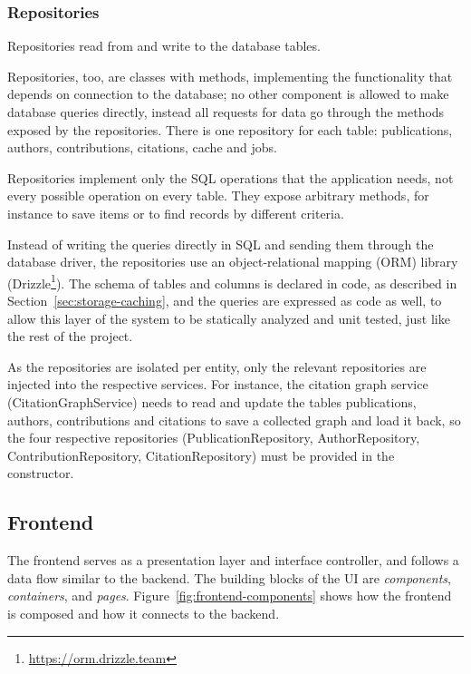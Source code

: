 \subsubsection{Repositories}

Repositories read from and write to the database tables.

Repositories, too, are classes with methods, implementing the functionality that depends on connection to the database; no other component is allowed to make database queries directly, instead all requests for data go through the methods exposed by the repositories.
There is one repository for each table: \textsf{publications}, \textsf{authors}, \textsf{contributions}, \textsf{citations}, \textsf{cache} and \textsf{jobs}.

Repositories implement only the SQL operations that the application needs, not every possible operation on every table.
They expose arbitrary methods, for instance to save items or to find records by different criteria.

Instead of writing the queries directly in SQL and sending them through the database driver, the repositories use an object-relational mapping (ORM) library (\textsf{Drizzle}\footnote{\url{https://orm.drizzle.team}}).
The schema of tables and columns is declared in code, as described in Section~\ref{sec:storage-caching}, and the queries are expressed as code as well, to allow this layer of the system to be statically analyzed and unit tested, just like the rest of the project.

As the repositories are isolated per entity, only the relevant repositories are injected into the respective services.
For instance, the citation graph service (\textsf{CitationGraphService}) needs to read and update the tables \textsf{publications}, \textsf{authors}, \textsf{contributions} and \textsf{citations} to save a collected graph and load it back, so the four respective repositories (\textsf{PublicationRepository}, \textsf{AuthorRepository}, \textsf{ContributionRepository}, \textsf{CitationRepository}) must be provided in the constructor.

\subsection{Frontend} \label{sec:frontend-layers}

The frontend serves as a presentation layer and interface controller, and follows a data flow similar to the backend.
The building blocks of the UI are \emph{components}, \emph{containers}, and \emph{pages}.
Figure~\ref{fig:frontend-components} shows how the frontend is composed and how it connects to the backend. 

